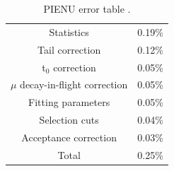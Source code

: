 \begin{table}[h!]
\centering
\caption{PIENU error table \cite{Aguilar-Arevalo3}.}
\label{syst_table}
\begin{tabular} {|c|c|}
\hline
Statistics & 0.19\% \\
Tail correction & 0.12\% \\
t$_0$ correction & 0.05\% \\
$\mu$ decay-in-flight correction & 0.05\% \\
Fitting parameters & 0.05\% \\
Selection cuts & 0.04\% \\
Acceptance correction & 0.03\% \\
\hline
Total & 0.25\% \\
\hline
\end{tabular}
\end{table}

 
 
